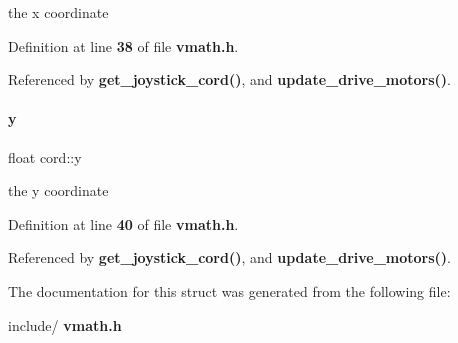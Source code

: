 the x coordinate 



Definition at line \textbf{ 38} of file \textbf{ vmath.\+h}.



Referenced by \textbf{ get\+\_\+joystick\+\_\+cord()}, and \textbf{ update\+\_\+drive\+\_\+motors()}.

\mbox{\label{structcord_a4e7d289c55cfe511532e53a81dc19215}} 
\paragraph{y}
{\footnotesize\ttfamily float cord\+::y}



the y coordinate 



Definition at line \textbf{ 40} of file \textbf{ vmath.\+h}.



Referenced by \textbf{ get\+\_\+joystick\+\_\+cord()}, and \textbf{ update\+\_\+drive\+\_\+motors()}.



The documentation for this struct was generated from the following file\+:\begin{DoxyCompactItemize}
\item 
include/\textbf{ vmath.\+h}\end{DoxyCompactItemize}
